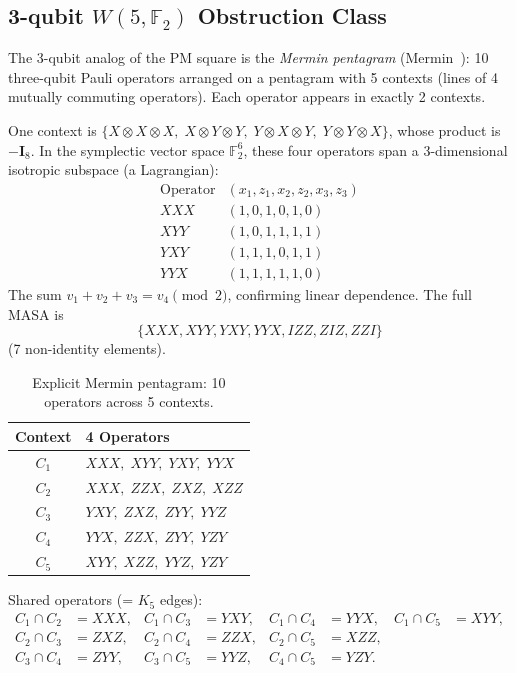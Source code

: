 \documentclass[11pt,a4paper]{article}
\theoremstyle{remark}
\newcommand{\F}{\mathbb{F}}
\begin{document}
\subsection{3-qubit $W(5, \F_2)$ Obstruction Class}
\label{sec:3qubit-obstruction}

The 3-qubit analog of the PM square is the \emph{Mermin pentagram}
(Mermin~\cite{Mermin1990}): 10 three-qubit Pauli operators arranged on a pentagram
with 5 contexts (lines of 4 mutually commuting operators). Each operator
appears in exactly 2 contexts.

One context is
$\{X \otimes X \otimes X,\; X \otimes Y \otimes Y,\; Y \otimes X \otimes Y,\;
Y \otimes Y \otimes X\}$, whose product is $-\mathbf{I}_8$. In the
symplectic vector space $\F_2^6$, these four operators span a
3-dimensional isotropic subspace (a Lagrangian):
\[
\begin{array}{c|c}
\text{Operator} & (x_1,z_1,x_2,z_2,x_3,z_3) \\ \hline
XXX & (1,0,1,0,1,0) \\
XYY & (1,0,1,1,1,1) \\
YXY & (1,1,1,0,1,1) \\
YYX & (1,1,1,1,1,0)
\end{array}
\]
The sum $v_1 + v_2 + v_3 = v_4 \pmod 2$, confirming linear dependence.
The full MASA is
\[
\{XXX, XYY, YXY, YYX, IZZ, ZIZ, ZZI\}
\]
(7 non-identity elements).

\begin{table}[h]
\centering
\begin{tabular}{c l}
\toprule
Context & 4 Operators \\
\midrule
$C_1$ & $XXX,\; XYY,\; YXY,\; YYX$ \\
$C_2$ & $XXX,\; ZZX,\; ZXZ,\; XZZ$ \\
$C_3$ & $YXY,\; ZXZ,\; ZYY,\; YYZ$ \\
$C_4$ & $YYX,\; ZZX,\; ZYY,\; YZY$ \\
$C_5$ & $XYY,\; XZZ,\; YYZ,\; YZY$ \\
\bottomrule
\end{tabular}
\caption{Explicit Mermin pentagram: 10 operators across 5 contexts.}
\label{tab:pentagram}
\end{table}

Shared operators (= $K_5$ edges):
\begin{align*}
C_1 \cap C_2 &= XXX, & C_1 \cap C_3 &= YXY, &
C_1 \cap C_4 &= YYX, & C_1 \cap C_5 &= XYY, \\
C_2 \cap C_3 &= ZXZ, & C_2 \cap C_4 &= ZZX, &
C_2 \cap C_5 &= XZZ, \\
C_3 \cap C_4 &= ZYY, & C_3 \cap C_5 &= YYZ, &
C_4 \cap C_5 &= YZY.
\end{align*}
\end{document}
